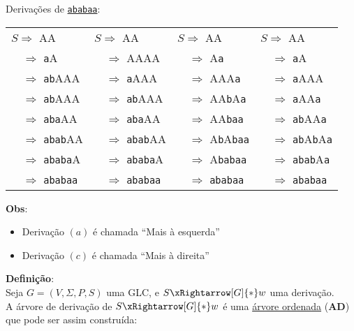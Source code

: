 Derivações de \underline{\texttt{ababaa}}: \\

\begin{center}
\begin{tabular}{l | l | l | l}
$S \Rightarrow$ AA 		                & $S \Rightarrow$ AA 		              & $S \Rightarrow$ AA 			                     & $S \Rightarrow$ AA\\
$\quad \Rightarrow$ \texttt{a}A 	    & $\quad \Rightarrow$ AAAA 		        & $\quad \Rightarrow$ A\texttt{a}  		         & $\quad \Rightarrow$ \texttt{a}A\\
$\quad  \Rightarrow$ \texttt{ab}AAA 	& $\quad \Rightarrow$ \texttt{a}AAA 	& $\quad \Rightarrow$ AAA\texttt{a} 	         & $\quad \Rightarrow$ \texttt{a}AAA\\
$\quad  \Rightarrow$ \texttt{ab}AAA 	& $\quad \Rightarrow$ \texttt{ab}AAA  & $\quad \Rightarrow$ AA\texttt{b}A\texttt{a}  & $\quad \Rightarrow$ \texttt{a}AA\texttt{a}\\
$\quad  \Rightarrow$ \texttt{aba}AA 	& $\quad \Rightarrow$ \texttt{aba}AA  & $\quad \Rightarrow$ AA\texttt{baa} 	         & $\quad \Rightarrow$ \texttt{ab}AA\texttt{a}\\
$\quad  \Rightarrow$ \texttt{abab}AA 	& $\quad \Rightarrow$ \texttt{abab}AA & $\quad \Rightarrow$ A\texttt{b}A\texttt{baa} & $\quad \Rightarrow$ \texttt{ab}A\texttt{b}A\texttt{a}\\
$\quad  \Rightarrow$ \texttt{ababa}A 	& $\quad \Rightarrow$ \texttt{ababa}A & $\quad \Rightarrow$ A\texttt{babaa} 	       & $\quad \Rightarrow$ \texttt{abab}A\texttt{a}\\
$\quad  \Rightarrow$ \texttt{ababaa} 	& $\quad \Rightarrow$ \texttt{ababaa} & $\quad \Rightarrow$ \texttt{ababaa} 	       & $\quad \Rightarrow$ \texttt{ababaa}
\end{tabular}
\end{center}

\textbf{Obs}:\\

\begin{itemize}
  \item Derivação $(a)$ é chamada {\color{red}``Mais à esquerda''}
  \item Derivação $(c)$ é chamada {\color{red}``Mais à direita''}
\end{itemize}

\textbf{Definição}:\\

Seja $G = (V, \Sigma, P, S)$ uma GLC, e $S \xRightarrow[G]{*} w$ uma derivação.\\
A {\color{red} árvore de derivação} de $S \xRightarrow[G]{*} w$  é uma \underline{árvore ordenada} (\textbf{AD}) que pode ser assim construída:\\

